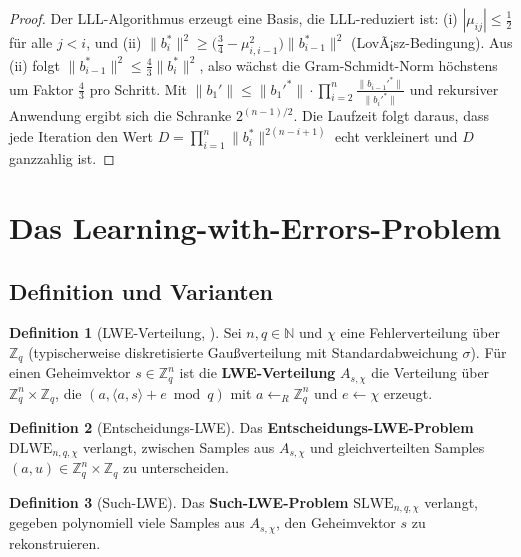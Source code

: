 ﻿\documentclass[a4paper,12pt]{article}
\theoremstyle{definition}
\newtheorem{definition}{Definition}[section]
\begin{document}
\begin{proof}
Der LLL-Algorithmus erzeugt eine Basis, die LLL-reduziert ist:
(i) $|\mu_{ij}| \leq \frac{1}{2}$ für alle $j < i$, und
(ii) $\|b_i^*\|^2 \geq \bigl(\frac{3}{4} - \mu_{i,i-1}^2\bigr) \|b_{i-1}^*\|^2$
(LovÃ¡sz-Bedingung).
Aus (ii) folgt $\|b_{i-1}^*\|^2 \leq \frac{4}{3} \|b_i^*\|^2$, also wächst
die Gram-Schmidt-Norm höchstens um Faktor $\frac{4}{3}$ pro Schritt.
Mit $\|b_1'\| \leq \|b_1'^*\| \cdot \prod_{i=2}^{n} \frac{\|b_{i-1}'^*\|}{\|b_i'^*\|}$
und rekursiver Anwendung ergibt sich die Schranke $2^{(n-1)/2}$.
Die Laufzeit folgt daraus, dass jede Iteration den Wert $D = \prod_{i=1}^{n} \|b_i^*\|^{2(n-i+1)}$
echt verkleinert und $D$ ganzzahlig ist.
\end{proof}

\section{Das Learning-with-Errors-Problem}

\subsection{Definition und Varianten}

\begin{definition}[LWE-Verteilung, \cite{Reg05}]
\label{def:lwe}
Sei $n, q \in \mathbb{N}$ und $\chi$ eine Fehlerverteilung über $\mathbb{Z}_q$
(typischerweise diskretisierte Gaußverteilung mit Standardabweichung $\sigma$).
Für einen Geheimvektor $s \in \mathbb{Z}_q^n$ ist die \textbf{LWE-Verteilung}
$A_{s,\chi}$ die Verteilung über $\mathbb{Z}_q^n \times \mathbb{Z}_q$,
die $(a, \langle a, s \rangle + e \bmod q)$ mit $a \leftarrow_R \mathbb{Z}_q^n$
und $e \leftarrow \chi$ erzeugt.
\end{definition}

\begin{definition}[Entscheidungs-LWE]
Das \textbf{Entscheidungs-LWE-Problem} $\mathrm{DLWE}_{n,q,\chi}$ verlangt,
zwischen Samples aus $A_{s,\chi}$ und gleichverteilten Samples
$(a, u) \in \mathbb{Z}_q^n \times \mathbb{Z}_q$ zu unterscheiden.
\end{definition}

\begin{definition}[Such-LWE]
Das \textbf{Such-LWE-Problem} $\mathrm{SLWE}_{n,q,\chi}$ verlangt,
gegeben polynomiell viele Samples aus $A_{s,\chi}$, den Geheimvektor $s$ zu rekonstruieren.
\end{definition}
\end{document}

